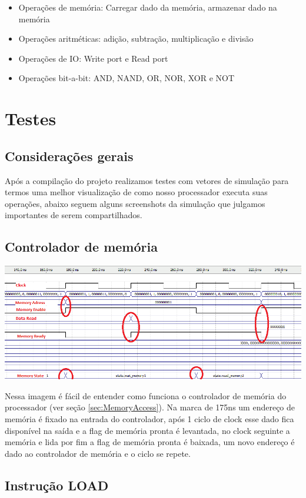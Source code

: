 \documentclass[11pt]{report}
\begin{document}
\begin{itemize}
	\item Operações de memória: Carregar dado da memória, armazenar dado na memória
	\item Operações aritméticas: adição, subtração, multiplicação e divisão
	\item Operações de IO: Write port e Read port
	\item Operações bit-a-bit: AND, NAND, OR, NOR, XOR e NOT
\end{itemize}

\chapter{Testes}
\section*{Considerações gerais}
Após a compilação do projeto realizamos testes com vetores de simulação para termos uma melhor visualização de como nosso processador executa suas operações, abaixo seguem alguns screenshots da simulação que julgamos importantes de serem compartilhados.

\section{Controlador de memória}

\includegraphics[width=\textwidth]{memory_controller}

Nessa imagem é fácil de entender como funciona o controlador de memória do processador (ver seção \ref{sec:MemoryAccess}). Na marca de 175ns um endereço de memória é fixado na entrada do controlador, após 1 ciclo de clock esse dado fica disponível na saída e a flag de memória pronta é levantada, no clock seguinte a memória e lida por fim a flag de memória pronta é baixada, um novo endereço é dado ao controlador de memória e o ciclo se repete.

\section{Instrução LOAD}
\end{document}
